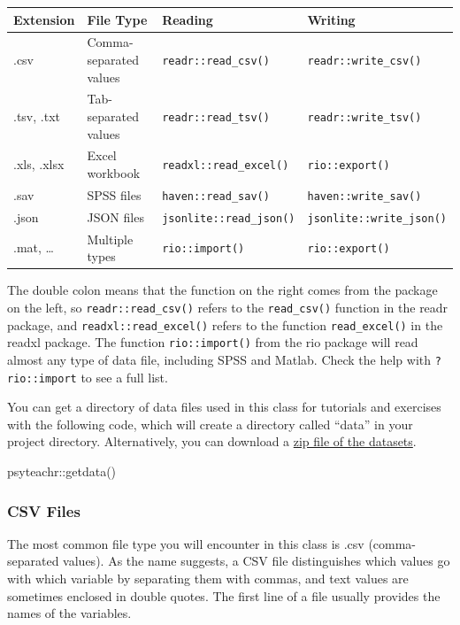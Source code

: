 \documentclass[
  oneside]{book}
\newenvironment{Shaded}{\begin{snugshade}}{\end{snugshade}}
\newcommand{\FunctionTok}[1]{\textcolor[rgb]{0.00,0.00,0.00}{#1}}
\newcommand{\NormalTok}[1]{#1}
\newcommand{\SpecialCharTok}[1]{\textcolor[rgb]{0.00,0.00,0.00}{#1}}
\begin{document}
\begin{longtable}[]{@{}llll@{}}
\toprule
Extension & File Type & Reading & Writing \\
\midrule
\endhead
.csv & Comma-separated values & \texttt{readr::read\_csv()} & \texttt{readr::write\_csv()} \\
.tsv, .txt & Tab-separated values & \texttt{readr::read\_tsv()} & \texttt{readr::write\_tsv()} \\
.xls, .xlsx & Excel workbook & \texttt{readxl::read\_excel()} & \texttt{rio::export()} \\
.sav & SPSS files & \texttt{haven::read\_sav()} & \texttt{haven::write\_sav()} \\
.json & JSON files & \texttt{jsonlite::read\_json()} & \texttt{jsonlite::write\_json()} \\
.mat, \ldots{} & Multiple types & \texttt{rio::import()} & \texttt{rio::export()} \\
\bottomrule
\end{longtable}

The double colon means that the function on the right comes from the package on the left, so \texttt{readr::read\_csv()} refers to the \texttt{read\_csv()} function in the readr package, and \texttt{readxl::read\_excel()} refers to the function \texttt{read\_excel()} in the readxl package. The function \texttt{rio::import()} from the rio package will read almost any type of data file, including SPSS and Matlab. Check the help with \texttt{?rio::import} to see a full list.

You can get a directory of data files used in this class for tutorials and exercises with the following code, which will create a directory called ``data'' in your project directory. Alternatively, you can download a \href{data/data.zip}{zip file of the datasets}.

\begin{Shaded}
\begin{Highlighting}[]
\NormalTok{psyteachr}\SpecialCharTok{::}\FunctionTok{getdata}\NormalTok{()}
\end{Highlighting}
\end{Shaded}

\hypertarget{csv-files}{%
\subsubsection{CSV Files}\label{csv-files}}

The most common file type you will encounter in this class is .csv (comma-separated values). As the name suggests, a CSV file distinguishes which values go with which variable by separating them with commas, and text values are sometimes enclosed in double quotes. The first line of a file usually provides the names of the variables.
\end{document}
